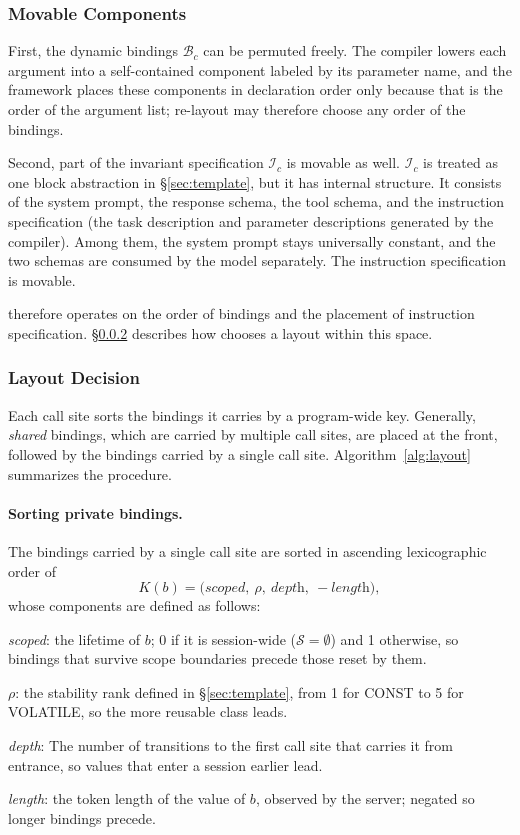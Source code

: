 \subsubsection{Movable Components}
First, the dynamic bindings $\mathcal{B}_c$ can be permuted freely. The compiler lowers each argument into a self-contained component labeled by its parameter name, and the framework places these components in declaration order only because that is the order of the argument list; re-layout may therefore choose any order of the bindings.

Second, part of the invariant specification $\mathcal{I}_c$ is movable as well. $\mathcal{I}_c$ is treated as one block abstraction in \S\ref{sec:template}, but it has internal structure. It consists of the system prompt, the response schema, the tool schema, and the instruction specification (the task description and parameter descriptions generated by the compiler). Among them, the system prompt stays universally constant, and the two schemas are consumed by the model separately. The instruction specification is movable. 

\sysname therefore operates on the order of bindings and the placement of instruction specification. \S\ref{sec:layout_decision} describes how \sysname chooses a layout within this space.

\subsubsection{Layout Decision}
\label{sec:layout_decision}
Each call site sorts the bindings it carries by a program-wide key. Generally, \emph{shared} bindings, which are carried by multiple call sites, are placed at the front, followed by the bindings carried by a single call site. Algorithm~\ref{alg:layout} summarizes the procedure.

\paragraph{Sorting private bindings.} The bindings carried by a single call site are sorted in ascending lexicographic order of
\[
K(b)=\big(\textit{scoped},\ \rho,\ \textit{depth},\ -\textit{length}\big),
\]
whose components are defined as follows:
\begin{enumerate*}[label=\textbf{(\roman*)}]
    \item \textit{scoped}: the lifetime of $b$; 0 if it is session-wide ($\mathcal{S}=\emptyset$) and 1 otherwise, so bindings that survive scope boundaries precede those reset by them.
    \item $\rho$: the stability rank defined in \S\ref{sec:template}, from 1 for CONST to 5 for VOLATILE, so the more reusable class leads.
    \item \textit{depth}: The number of transitions to the first call site that carries it from entrance, so values that enter a session earlier lead.
    \item \textit{length}: the token length of the value of $b$, observed by the server; negated so longer bindings precede.
\end{enumerate*}

